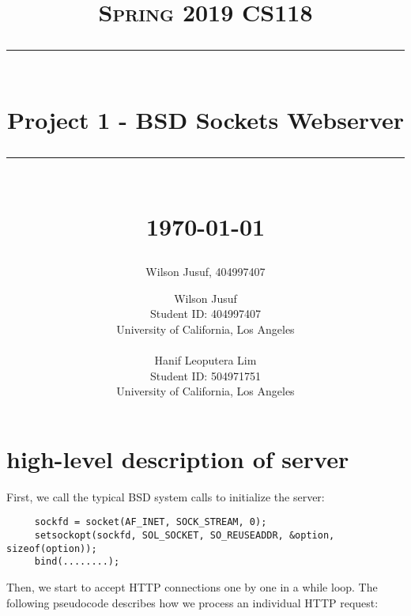 \documentclass[11pt]{article}
\author{Wilson Jusuf, 404997407}
\newcommand{\HRule}[1]{\rule{\linewidth}{#1}}
\begin{document}
\title{ \normalsize \textsc{Spring 2019 CS118}
		\\ [2.0cm]
		\HRule{0.5pt} \\
		\LARGE \textbf{Project 1 - BSD Sockets Webserver}
		\HRule{2pt} \\ [0.5cm]
		\normalsize \today \vspace*{5\baselineskip}}

\date{}

\author{
        Wilson Jusuf\\
		Student ID: 404997407\\
		University of California, Los Angeles\\\\
        Hanif Leoputera Lim\\
		Student ID: 504971751\\
		University of California, Los Angeles}

\maketitle
\newpage

\section{high-level description of server}

First, we call the typical BSD system calls to initialize the server:

\begin{verbatim}
     sockfd = socket(AF_INET, SOCK_STREAM, 0);
     setsockopt(sockfd, SOL_SOCKET, SO_REUSEADDR, &option, sizeof(option));
     bind(........);
\end{verbatim}
Then, we start to accept HTTP connections one by one in a while loop. 
The following pseudocode describes how we process an individual HTTP request:
\end{document}
